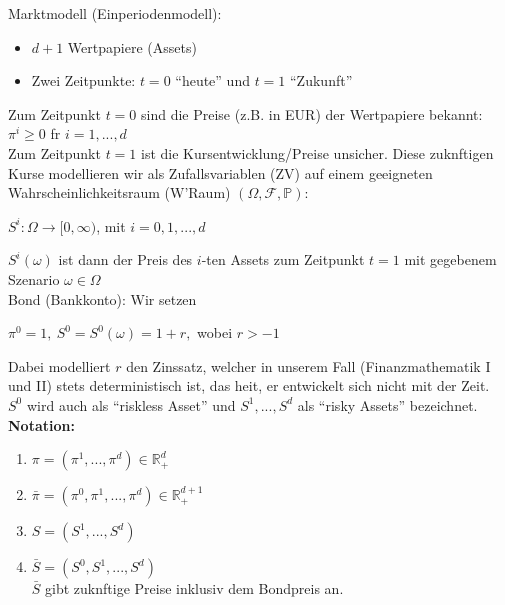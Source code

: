 \documentclass[envcountsame,envcountchap,envcountsect,amsart]{svmono}
\begin{document}
Marktmodell (Einperiodenmodell):
\begin{itemize}
	\item $d+1$ Wertpapiere (Assets)
	\item Zwei Zeitpunkte: $t=0$ "`heute"' und $t=1$  "`Zukunft"'
\end{itemize}
Zum Zeitpunkt $t=0$ sind die Preise (z.B. in EUR) der Wertpapiere bekannt: $\pi^i\geq 0$ fr $i=1,...,d$\vspace*{.1cm}\\
Zum Zeitpunkt $t=1$ ist die Kursentwicklung/Preise unsicher. Diese zuknftigen Kurse modellieren wir als Zufallsvariablen (ZV) auf einem geeigneten Wahrscheinlichkeitsraum (W'Raum) $\left(\Omega,\mathcal{F},\mathbb{P}\right)$:
\begin{center}
$S^i:\Omega\rightarrow [0,\infty)$, mit $i=0,1,...,d$
\end{center}
$S^i\left(\omega\right)$ ist dann der Preis des $i$-ten Assets zum Zeitpunkt $t=1$ mit gegebenem Szenario $\omega\in \Omega$\vspace*{.2cm}\\
Bond (Bankkonto): Wir setzen
\begin{center}
$\pi^0=1,\ S^0=S^0\left(\omega\right)=1+r,$ wobei $r>-1$
\end{center}
Dabei modelliert $r$ den Zinssatz, welcher in unserem Fall (Finanzmathematik I und II) stets deterministisch ist, das heit, er entwickelt sich nicht mit der Zeit.\vspace*{.1cm}\\
$S^0$ wird auch als "`riskless Asset"' und $S^1,...,S^d$ als "`risky Assets"' bezeichnet.\vspace*{.2cm}\\
\textbf{Notation:}
\begin{enumerate}
\item[] $\pi=\left(\pi^1,...,\pi^d\right)\in \mathds{R}^d_+$\vspace*{.1cm}
\item[] $\bar{\pi}=\left(\pi^0,\pi^1,...,\pi^d\right)\in \mathds{R}^{d+1}_+$\vspace*{.1cm}
\item[] $ S=\left(S^1,...,S^d\right)$\vspace*{.1cm}\\
\item[] $\bar{S}=\left(S^0,S^1,...,S^d\right)$\vspace*{.1cm}\\
$\bar{S}$ gibt zuknftige Preise inklusiv dem Bondpreis an.
\end{enumerate}
\end{document}
